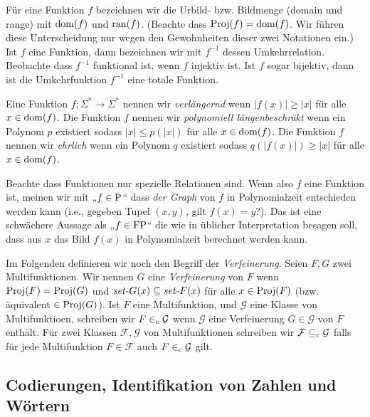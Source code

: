 Für eine Funktion $f$ bezeichnen wir die Urbild- bzw. Bildmenge (domain und range) mit $\dom(f)$ und $\ran(f)$. (Beachte dass $\Proj(f)=\dom(f)$. Wir führen diese Unterscheidung nur wegen den Gewohnheiten dieser zwei Notationen ein.) Ist $f$ eine Funktion, dann bezeichnen wir mit $f^{-1}$ dessen Umkehrrelation. Beobachte dass $f^{-1}$ funktional ist, wenn $f$ injektiv ist. Ist $f$ sogar bijektiv, dann ist die Umkehrfunktion $f^{-1}$ eine totale Funktion.

Eine Funktion $f\colon\Sigma^*\to\Sigma^*$ nennen wir \emph{verlängernd} wenn $|f(x)|\geq |x|$ für alle $x\in\dom(f)$.
Die Funktion $f$ nennen wir \emph{polynomiell längenbeschräkt} wenn ein Polynom $p$ existiert sodass $|x|\leq p(|x|)$ für alle $x\in\dom(f)$.
Die Funktion $f$ nennen wir \emph{ehrlich} wenn ein Polynom $q$ existiert sodass $q(|f(x)|)\geq |x|$ für alle $x\in\dom(f)$.

Beachte dass Funktionen nur spezielle Relationen sind. Wenn also $f$ eine Funktion ist, meinen wir mit „$f\in\P$“ dass \emph{der Graph} von $f$ in Polynomialzeit entschieden werden kann (i.e., gegeben Tupel $(x, y)$, gilt $f(x)=y$?). Das ist eine schwächere Aussage als „$f\in\FP$“ die wie in üblicher Interpretation besagen soll, dass aus $x$ das Bild $f(x)$ in Polynomialzeit berechnet werden kann.

Im Folgenden definieren wir noch den Begriff der \emph{Verfeinerung}. Seien $F, G$ zwei Multifunktionen. Wir nennen $G$ eine \emph{Verfeinerung} von $F$ wenn $\Proj(F)=\Proj(G)$ und $\fset{}G(x)\subseteq \fset{}F(x)$ für alle $x\in\Proj(F)$ (bzw. äquivalent $\in \Proj(G)$).
Ist $F$ eine Multifunktion, und $\mathcal G$ eine Klasse von Multifunktioen, schreiben wir $F\inc \mathcal G$ wenn $\mathcal G$ eine Verfeinerung $G\in\mathcal G$ von $F$ enthält.
Für zwei Klassen $\mathcal F, \mathcal G$ von Multifunktionen schreiben wir $\mathcal F \subseteqc \mathcal G$ falls für jede Multifunktion $F\in\mathcal F$ auch $F\inc \mathcal G$ gilt.

\subsection*{Codierungen, Identifikation von Zahlen und Wörtern}

